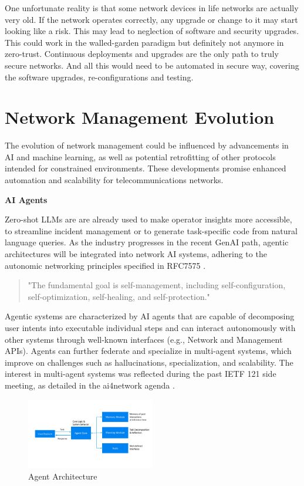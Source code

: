 \documentclass[10pt,sigconf]{iabart}
\begin{document}
One unfortunate reality is that some network devices in life networks are actually very old. If the network operates correctly, any upgrade or change to it may start looking like a risk. This may lead to neglection of software and security upgrades. This could work in the walled-garden paradigm but definitely not anymore in zero-trust. Continuous deployments and upgrades are the only path to truly secure networks. And all this would need to be automated in secure way, covering the software upgrades, re-configurations and testing.

 
\section{Network Management Evolution} \label{insights}

The evolution of network management could be influenced by advancements in AI and machine learning, as well as potential retrofitting of other protocols intended for constrained environments. These developments promise enhanced automation and scalability for telecommunications networks.

\textbf{AI Agents}

Zero-shot LLMs are are already used to make operator insights more accessible, to streamline incident management or to generate task-specific code from natural language queries. As the industry progresses in the recent GenAI path, agentic architectures will be integrated into network AI systems, adhering to the autonomic networking principles specified in RFC7575 \cite{RFC7575}.

\begin{quote}
"The fundamental goal is self-management, including self-configuration, self-optimization, self-healing, and self-protection." 
\end{quote}

Agentic systems are characterized by AI agents that are capable of decomposing user intents into executable individual steps and can interact autonomously with other systems through well-known interfaces (e.g., Network and Management APIs). Agents can further federate and specialize in multi-agent systems, which improve on challenges such as hallucinations, specialization, and scalability. The interest in multi-agent systems was reflected during the past IETF 121 side meeting, as detailed in the ai4network agenda \cite{ai4network-agenda}. 

\begin{figure}[h]
  \centering
  \includegraphics[width=0.5\textwidth]{figs/agent.pdf}
  \caption{Agent Architecture}
  \label{fig:agent_architecture}
\end{figure}
\end{document}
